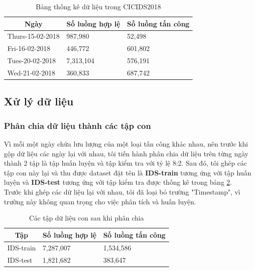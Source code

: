 \begin{table}[ht!]
\centering
	\begin{tabular}{|l|l|l|}
		\hline
		\multicolumn{1}{|c|}{\textbf{Ngày}} & \multicolumn{1}{c|}{\textbf{Số luồng hợp lệ}} & \multicolumn{1}{c|}{\textbf{Số luồng tấn công}} \\ \hline
		Thurs-15-02-2018 & 987,980   & 52,498  \\ \hline
		Fri-16-02-2018   & 446,772   & 601,802 \\ \hline
		Tues-20-02-2018  & 7,313,104 & 576,191 \\ \hline
		Wed-21-02-2018   & 360,833   & 687,742 \\ \hline
	\end{tabular}
\caption{Bảng thống kê dữ liệu trong CICIDS2018}
\label{tab:stat-ids2018}
\end{table}

\subsection{Xử lý dữ liệu}

\subsubsection{Phân chia dữ liệu thành các tập con}

Vì mỗi một ngày chứa lưu lượng của một loại tấn công khác nhau, nên trước khi gộp dữ liệu các ngày lại với nhau, tôi tiến hành phân chia dữ liệu trên từng ngày thành 2 tập là tập huấn luyện và tập kiểm tra với tỷ lệ 8:2. Sau đó, tôi ghép các tập con này lại và thu được dataset đặt tên là \textbf{IDS-train} tương ứng với tập huấn luyện và \textbf{IDS-test} tương ứng với tập kiểm tra được thống kê trong bảng \ref{tab:sub-dataset}. Trước khi ghép các dữ liệu lại với nhau, tôi đã loại bỏ trường "Timestamp", vì trường này không quan trọng cho việc phân tích và huấn luyện.

\begin{table}[ht!]
\centering
	\begin{tabular}{|l|l|l|}
		\hline
		\multicolumn{1}{|c|}{\textbf{Tập}} & \multicolumn{1}{c|}{\textbf{Số luồng hợp lệ}} & \multicolumn{1}{c|}{\textbf{Số luồng tấn công}} \\ \hline
		IDS-train                          & 7,287,007                                     & 1,534,586                                       \\ \hline
		IDS-test                           & 1,821,682                                     & 383,647                                         \\ \hline
	\end{tabular}
\caption{Các tập dữ liệu con sau khi phân chia}
\label{tab:sub-dataset}
\end{table}

